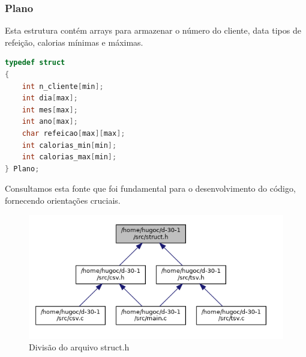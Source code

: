 \documentclass[a4wide]{report}
\begin{document}
\subsubsection{Plano }
Esta estrutura contém arrays para armazenar o número do cliente, data tipos de refeição, calorias mínimas e máximas.
\\
\begin{lstlisting}[xleftmargin=7em, xrightmargin=7em,language=C, caption={Struct Plano}, label={codigo:c}]
typedef struct
{
    int n_cliente[min];
    int dia[max];
    int mes[max];
    int ano[max];
    char refeicao[max][max];
    int calorias_min[min];
    int calorias_max[min];
} Plano;
\end{lstlisting}
\cite{geeksforgeeks_structures} Consultamos esta fonte que foi fundamental para o desenvolvimento do código, fornecendo orientações cruciais. 
\begin{figure}[h]
    \centering
    \vspace{2 cm}
    \includegraphics[width=0.8\linewidth]{struct.h.png}
    \caption{Divisão do arquivo struct.h}
    \label{fig:divisaotsv}

\end{figure}
\newpage
\end{document}
